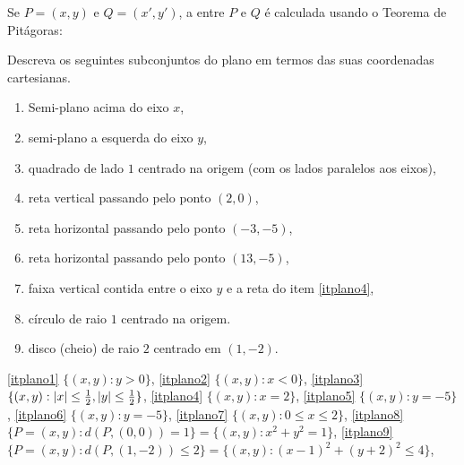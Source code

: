 Se $P=(x,y)$ e $Q=(x',y')$, a 
entre $P$ e $Q$ é calculada usando o Teorema de Pitágoras:
\begin{center}
\begin{bmlimage}\end{bmlimage}
\end{center}

\begin{exo}\label{Exo:subconjplano}
Descreva os seguintes subconjuntos do plano em termos das suas coordenadas cartesianas.
\begin{enumerate}
\item\label{itplano1}  Semi-plano acima do eixo $x$,
\item\label{itplano2}  semi-plano a esquerda do eixo $y$,
\item\label{itplano3}  quadrado de lado $1$ centrado na origem (com os lados
paralelos aos eixos),
\item\label{itplano4}  reta vertical passando pelo ponto $(2,0)$, 
\item\label{itplano5}  reta horizontal passando pelo ponto $(-3,-5)$, 
\item\label{itplano6}  reta horizontal passando pelo ponto $(13,-5)$,
 \item\label{itplano7}  faixa vertical contida entre o eixo $y$ e a reta do item
\eqref{itplano4},
\item\label{itplano8}  círculo de raio $1$ centrado na origem. 
\item\label{itplano9}  disco (cheio) de raio $2$ centrado em $(1,-2)$.
\end{enumerate}
\begin{sol}
\eqref{itplano1} $\{(x,y):y> 0\}$,
\eqref{itplano2} $\{(x,y):x< 0\}$,
\eqref{itplano3} $\{(x,y):|x|\leq \frac{1}{2}, |y|\leq \frac{1}{2}\}$,
\eqref{itplano4} $\{(x,y): x=2\}$,
\eqref{itplano5} $\{(x,y): y=-5\}$,
\eqref{itplano6} $\{(x,y): y=-5\}$,
\eqref{itplano7} $\{(x,y): 0\leq x\leq 2\}$,
\eqref{itplano8} $\{P=(x,y): d(P,(0,0))=1\}=\{(x,y):x^2+y^2=1\}$,
\eqref{itplano9} $\{P=(x,y): d(P,(1,-2))\leq 2\}=\{(x,y):(x-1)^2+(y+2)^2\leq 4\}$,
\end{sol}
\end{exo}

